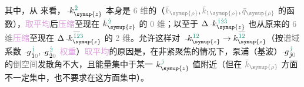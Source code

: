 其中，从  来看，$\xint{\begin{smallmatrix} ~ \\ {}^{}_{\mathcolor{gray}{-}} \\ ~ \end{smallmatrix}}{15}{k}_{\symup{z}}^{\;\! \textcolor{PineGreen}{\hat{2}} }$ 本身是 \textcolor{gray}{$6$ 维}的（$\mathcolor{gray}{\bar{k}_{\symup{\rho}}}, \mathcolor{gray}{\bar{k}_{1\symup{\rho}}}, \mathcolor{gray}{\bar{q}_{\symup{\rho}}}$ 的函数），\textcolor{Plum}{取平均}后\textcolor{Plum}{压缩}至现在 $\textcolor{Gray}{\bar{\textcolor{Black}{k}}}_{\symup{z}}^{\;\! \textcolor{PineGreen}{\hat{2}} }$ 的 \textcolor{gray}{0 维}；以至于 $\Delta \xint{\begin{smallmatrix} ~ \\ {}^{}_{\mathcolor{gray}{-}} \\ ~ \end{smallmatrix}}{15}{k}_{\symup{z}}^{\;\! \textcolor{PineGreen}{\hat{1} \hat{2} \hat{3}} }$ 也从原来的 \textcolor{gray}{6 维}\textcolor{Plum}{压缩}至现在 $\Delta \xint{\begin{smallmatrix} ~ \\ {}^{}_{\mathcolor{gray}{-}} \\ ~ \end{smallmatrix}}{15}{k}_{\symup{z}}^{\;\! \textcolor{gray}{\overline{\textcolor{PineGreen}{\hat{1} \hat{2}}}} \textcolor{PineGreen}{\hat{3}} }$ 的 \textcolor{gray}{2 维}。允许这样对 $\xint{\begin{smallmatrix} ~ \\ {}^{}_{\mathcolor{gray}{-}} \\ ~ \end{smallmatrix}}{15}{k}_{\symup{z}}^{\;\! \textcolor{PineGreen}{\hat{1} \hat{2}} } \to k_{\symup{z}}^{\;\! \textcolor{gray}{\overline{\textcolor{PineGreen}{\hat{1} \hat{2}}}} }$（按\textcolor{gray}{谱域}\textcolor{NavyBlue}{系数} $\xint{{}^{}_{\mathcolor{gray}{-}}}{10}{g}^{\;\! \textcolor{PineGreen}{\hat{1}}}_{\;\! \hat{1} \mathcolor{gray}{0}}, \xint{{}^{}_{\mathcolor{gray}{-}}}{10}{g}^{\;\! \textcolor{PineGreen}{\hat{2}}}_{\;\! \hat{2} \mathcolor{gray}{0}}$ \textcolor{Plum}{权重}）\textcolor{Plum}{取平均}的原因是，在\textcolor{PineGreen}{非紧聚焦}的情况下，\textcolor{NavyBlue}{泵浦}（\textcolor{NavyBlue}{基波}）$\xint{{}^{}_{\mathcolor{gray}{-}}}{10}{g}^{\;\! \textcolor{PineGreen}{\hat{\jmath}}}_{\;\! \hat{\jmath} \mathcolor{gray}{0}}$ 的\textcolor{gray}{倒空间}\textcolor{PineGreen}{发散角}不大，且\textcolor{NavyBlue}{能量集中}于某一 $k_{\symup{z}}^{\;\! \textcolor{PineGreen}{\hat{\jmath}} }$ 值附近（但在 $\mathcolor{gray}{\bar{k}_{\symup{\rho}}}$ 方面不一定集中，也不要求在这方面集中）。

